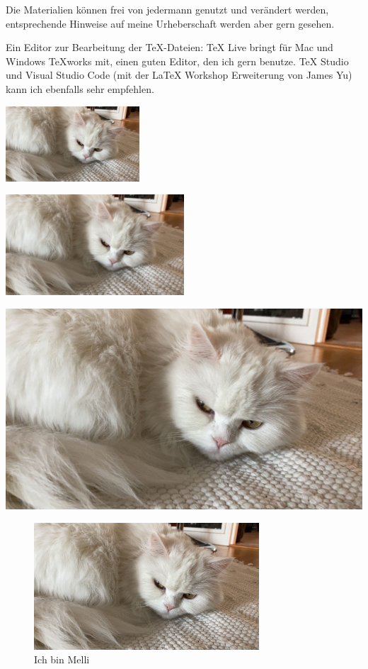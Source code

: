 \documentclass[ngerman,12pt]{scrartcl}
\begin{document}
Die Materialien können frei von jedermann genutzt und verändert werden, entsprechende Hinweise auf meine Urheberschaft werden aber gern gesehen.

Ein Editor zur Bearbeitung der TeX-Dateien: TeX Live bringt für Mac und Windows TeXworks mit, einen guten Editor, den ich gern benutze. 
TeX Studio und Visual Studio Code (mit der LaTeX Workshop Erweiterung von James Yu) kann ich ebenfalls sehr empfehlen.

\includegraphics[width=5cm]{Bilder/miau}

\includegraphics[width=0.5\textwidth]{Bilder/miau} %

\includegraphics[width=\textwidth,angle=45]{Bilder/miau} %

\blindtext[3]

\begin{figure}[b] %
\centering
\includegraphics[width=0.75\textwidth]{Bilder/miau} %
\caption{Ich bin Melli}\label{fig:melli}
\end{figure}
\end{document}
